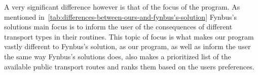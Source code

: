 A very significant difference however is that of the focus of the program.
As mentioned in~\ref{tab:differences-between-ours-and-fynbus's-solution} Fynbus's solutions main focus is to inform the
user of the consequences of different transport types in their routines.
This topic of focus is what makes our program vastly different to Fynbus's solution, as our program, as well as inform
the user the same way Fynbus's solutions does, also makes a prioritized list of the available public transport routes
and ranks them based on the users preferences.
